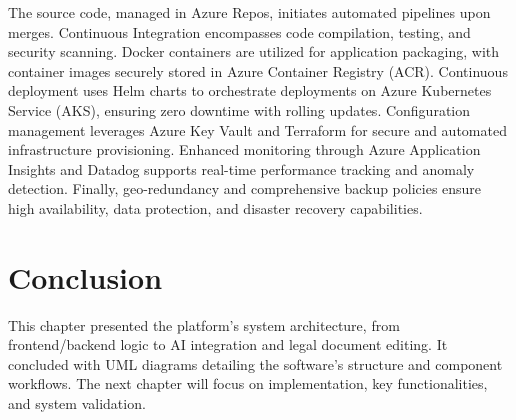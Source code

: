 The source code, managed in Azure Repos, initiates automated pipelines upon merges. Continuous Integration encompasses code compilation, testing, and security scanning. Docker containers are utilized for application packaging, with container images securely stored in Azure Container Registry (ACR). Continuous deployment uses Helm charts to orchestrate deployments on Azure Kubernetes Service (AKS), ensuring zero downtime with rolling updates. Configuration management leverages Azure Key Vault and Terraform for secure and automated infrastructure provisioning. Enhanced monitoring through Azure Application Insights and Datadog supports real-time performance tracking and anomaly detection. Finally, geo-redundancy and comprehensive backup policies ensure high availability, data protection, and disaster recovery capabilities.

\section{Conclusion}
This chapter presented the platform’s system architecture, from frontend/backend logic to AI integration and legal document editing. It concluded with UML diagrams detailing the software’s structure and component workflows. The next chapter will focus on implementation, key functionalities, and system validation.